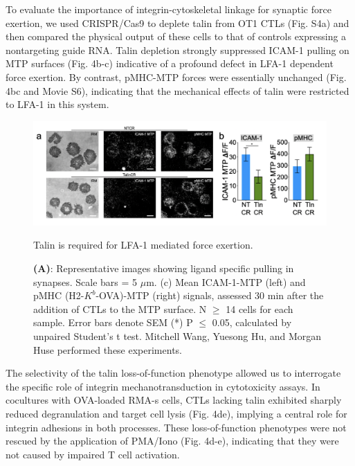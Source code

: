 To evaluate the importance of integrin-cytoskeletal linkage for synaptic force exertion, we used CRISPR/Cas9 to deplete talin from OT1 CTLs (Fig. S4a) and then compared the physical output of these cells to that of controls expressing a nontargeting guide RNA. Talin depletion strongly suppressed ICAM-1 pulling on MTP surfaces (Fig. 4b-c) indicative of a profound defect in LFA-1 dependent force exertion. By contrast, pMHC-MTP forces were essentially unchanged (Fig. 4bc and Movie S6), indicating that the mechanical effects of talin were restricted to LFA-1 in this system. 

\begin{figure}[htbp]
	\centering
	\includegraphics[width=1.0\columnwidth]{../figures/chapter3/fig4mtp.png}
	\caption{Talin is required for LFA-1 mediated force exertion.}
	\caption*{\textbf{(A)}: Representative images showing ligand specific pulling in synapses. Scale bars = 5 $\mu$m. (c) Mean ICAM-1-MTP (left) and pMHC (H2-$K^{b}$-OVA)-MTP (right) signals, assessed 30 min after the addition of CTLs to the MTP surface. N $\geq$ 14 cells for each sample.  Error bars denote SEM (*) P $\leq$ 0.05, calculated by unpaired Student’s t test. Mitchell Wang, Yuesong Hu, and Morgan Huse performed these experiments.}
	\label{fig:fig4mtp}
\end{figure} 

The selectivity of the talin loss-of-function phenotype allowed us to interrogate the specific role of integrin mechanotransduction in cytotoxicity assays. In cocultures with OVA-loaded RMA-s cells, CTLs lacking talin exhibited sharply reduced degranulation and target cell lysis (Fig. 4de), implying a central role for integrin adhesions in both processes. These loss-of-function phenotypes were not rescued by the application of PMA/Iono (Fig. 4d-e), indicating that they were not caused by impaired T cell activation. 

